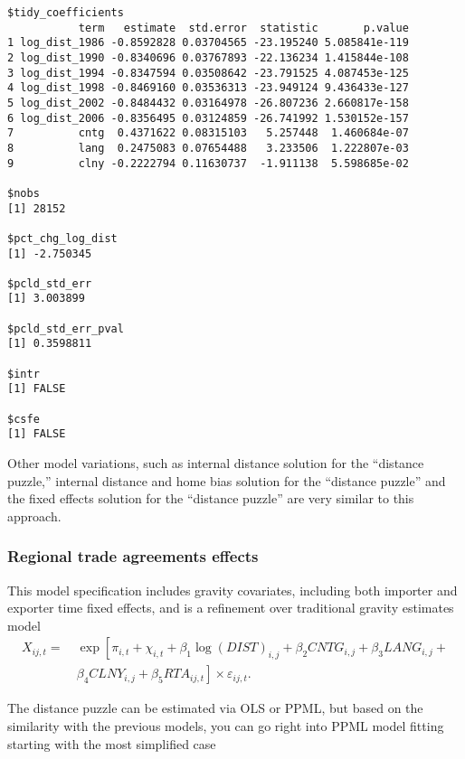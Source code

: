 \documentclass[12pt,reqno,oneside,pdftex]{formato-puc/puctesis} %
\begin{document}
\begin{verbatim}
$tidy_coefficients
           term   estimate  std.error  statistic       p.value
1 log_dist_1986 -0.8592828 0.03704565 -23.195240 5.085841e-119
2 log_dist_1990 -0.8340696 0.03767893 -22.136234 1.415844e-108
3 log_dist_1994 -0.8347594 0.03508642 -23.791525 4.087453e-125
4 log_dist_1998 -0.8469160 0.03536313 -23.949124 9.436433e-127
5 log_dist_2002 -0.8484432 0.03164978 -26.807236 2.660817e-158
6 log_dist_2006 -0.8356495 0.03124859 -26.741992 1.530152e-157
7          cntg  0.4371622 0.08315103   5.257448  1.460684e-07
8          lang  0.2475083 0.07654488   3.233506  1.222807e-03
9          clny -0.2222794 0.11630737  -1.911138  5.598685e-02

$nobs
[1] 28152

$pct_chg_log_dist
[1] -2.750345

$pcld_std_err
[1] 3.003899

$pcld_std_err_pval
[1] 0.3598811

$intr
[1] FALSE

$csfe
[1] FALSE
\end{verbatim}

Other model variations, such as internal distance solution for the
``distance puzzle,'' internal distance and home bias solution for the
``distance puzzle'' and the fixed effects solution for the ``distance
puzzle'' are very similar to this approach.

\hypertarget{regional-trade-agreements-effects}{%
\subsubsection{Regional trade agreements
effects}\label{regional-trade-agreements-effects}}

This model specification includes gravity covariates, including both
importer and exporter time fixed effects, and is a refinement over
traditional gravity estimates model \begin{align*}
X_{ij,t} =& \:\exp\left[\pi_{i,t} + \chi_{i,t} + \beta_1 \log(DIST)_{i,j} + \beta_2 CNTG_{i,j} + \beta_3 LANG_{i,j} +\right.\\
\text{ }& \:\left.\beta_4 CLNY_{i,j} + \beta_5 RTA_{ij,t}\right] \times \varepsilon_{ij,t}.
\end{align*}

The distance puzzle can be estimated via OLS or PPML, but based on the
similarity with the previous models, you can go right into PPML model
fitting starting with the most simplified case
\end{document}
